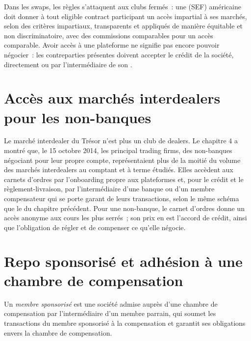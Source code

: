 Dans les swaps, les règles s'attaquent aux clubs fermés~: une  (SEF) américaine doit
donner à tout eligible contract participant un accès impartial à ses marchés, selon des critères
impartiaux, transparents et appliqués de manière équitable et non discriminatoire, avec des
commissions comparables pour un accès comparable. Avoir accès à une plateforme ne signifie pas encore
pouvoir négocier~: les contreparties présentes doivent accepter le crédit de la société, directement ou
par l'intermédiaire de son .

\section{Accès aux marchés interdealers pour les non-banques}

Le marché interdealer du Trésor n'est plus un club de dealers. Le chapitre 4 a montré que, le
15 octobre 2014, les principal trading firms, des non-banques négociant pour leur propre compte,
représentaient plus de la moitié du volume des marchés interdealers au comptant et à terme
étudiés. Elles accèdent aux carnets d'ordres par l'onboarding propre aux plateformes et,
pour le crédit et le règlement-livraison, par l'intermédiaire d'une banque ou d'un membre compensateur qui se porte garant de leurs
transactions, selon le même schéma que le  du chapitre précédent. Pour une
non-banque, le carnet d'ordres donne un accès anonyme aux cours les plus serrés~; son prix
en est l'accord de crédit, ainsi que l'obligation de régler et de compenser ce qu'elle négocie.

\section{Repo sponsorisé et adhésion à une chambre de compensation}

\begin{definition}\label{def:m2:getting-access-rates-credit:sponsored}
Un \emph{membre sponsorisé} est une société admise auprès d'une
chambre de compensation par l'intermédiaire d'un membre parrain, qui soumet les transactions du
membre sponsorisé à la compensation et garantit ses obligations envers la chambre de compensation.
\end{definition}

